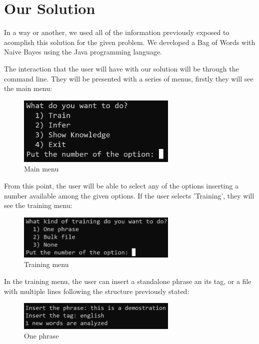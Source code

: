 \documentclass[sigconf,12pt,review=false,natbib=false]{acmart}
\begin{document}
\section{Our Solution}

In a way or another, we used all of the information previously exposed to acomplish this solution for the given problem.
We developed a Bag of Words with Naive Bayes using the Java programming language.

The interaction that the user will have with our solution will be through the command line. They will be presented
with a series of menus, firstly they will see the main menu:

\begin{figure}[h!]
    \centering
    \includegraphics[width=3in]{main_menu}
    \caption{Main menu}
    \label{fig:main_menu}
\end{figure}

From this point, the user will be able to select any of the options inserting a number available among the given
options. If the user selects 'Training', they will see the training menu:

\begin{figure}[h!]
    \centering
    \includegraphics[width=3in]{training_menu}
    \caption{Training menu}
    \label{fig:training_menu}
\end{figure}

In the training menu, the user can insert a standalone phrase an its tag, or a file with multiple lines following the
structure previously stated:

\begin{figure}[h!]
    \centering
    \includegraphics[width=3in]{one_phrase}
    \caption{One phrase}
    \label{fig:one_phrase}
\end{figure}
\end{document}

